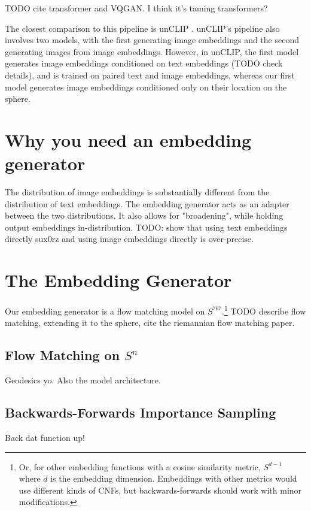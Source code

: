 \documentclass{article} %
\begin{document}
TODO cite transformer and VQGAN. I think it's taming transformers?

The closest comparison to this pipeline is unCLIP
\citep{ramesh2022hierarchicaltextconditionalimagegeneration}. unCLIP's pipeline also involves two
models, with the first generating image embeddings and the second generating images from image
embeddings. However, in unCLIP, the first model generates image embeddings conditioned on text
embeddings (TODO check details), and is trained on paired text and image embeddings, whereas our
first model generates image embeddings conditioned only on their location on the sphere.

\section{Why you need an embedding generator}

The distribution of image embeddings is substantially different from the distribution of text
embeddings. The embedding generator acts as an adapter between the two distributions. It also allows
for "broadening", while holding output embeddings in-distribution. TODO: show that using text
embeddings directly sux0rz and using image embeddings directly is over-precise.

\section{The Embedding Generator}
Our embedding generator is a flow matching\citep{lipman2023flowmatchinggenerativemodeling} model on
$S^{767}$.\footnote{Or, for other embedding functions with a cosine similarity metric, $S^{d-1}$
where $d$ is the embedding dimension. Embeddings with other metrics would use different kinds of
CNFs, but backwards-forwards should work with minor modifications.} TODO describe flow matching,
extending it to the sphere, cite the riemannian flow matching paper.

\subsection{Flow Matching on $S^n$}

Geodesics yo. Also the model architecture.

\subsection{Backwards-Forwards Importance Sampling}

Back dat function up!
\end{document}
